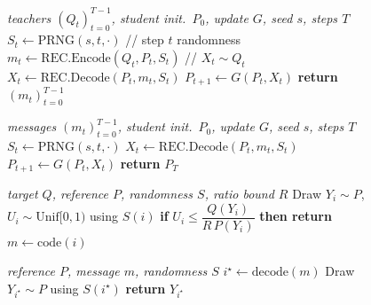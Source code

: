 \documentclass{article}
\newcommand{\cmt}[1]{\hfill{\color{cmt}// #1}}
\newcommand{\algstyle}{\renewcommand{\algorithmicrequire}{\textit{\textbf{Input:}}}}
\theoremstyle{plain}
\theoremstyle{definition}
\theoremstyle{remark}
\begin{document}
\begin{figure}[t]
%
\noindent
\begin{minipage}[t]{0.49\linewidth}
\begin{tcolorbox}[algbox={encInk}{encBody}{encBar}{Requential.Encode}, equal height group=algr1]
\begin{algorithmic}[1]
\algstyle
\REQUIRE \textit{teachers $(Q_t)_{t=0}^{T-1}$, student init.\ $P_0$, update $G$, seed $s$, steps $T$}
  \STATE $S_t \leftarrow \mathrm{PRNG}(s,t,\cdot)$ \cmt{step $t$ randomness}
  \STATE $m_t \leftarrow \mathrm{REC.Encode}(Q_t, P_t, S_t)$ \cmt{$X_t \sim Q_t$}
  \STATE $X_t \leftarrow \mathrm{REC.Decode}(P_t, m_t, S_t)$
  \STATE $P_{t+1} \leftarrow G(P_t, X_t)$
\ENDFOR
\STATE \textbf{return} $(m_t)_{t=0}^{T-1}$
\end{algorithmic}
\end{tcolorbox}
\end{minipage}\hfill
\begin{minipage}[t]{0.49\linewidth}
\begin{tcolorbox}[algbox={decInk}{decBody}{decBar}{Requential.Decode}, equal height group=algr1]
\begin{algorithmic}[1]
\algstyle
\REQUIRE \textit{messages $(m_t)_{t=0}^{T-1}$, student init.\ $P_0$, update $G$, seed $s$, steps $T$}
  \STATE $S_t \leftarrow \mathrm{PRNG}(s,t,\cdot)$
  \STATE $X_t \leftarrow \mathrm{REC.Decode}(P_t, m_t, S_t)$
  \STATE $P_{t+1} \leftarrow G(P_t, X_t)$
\ENDFOR
\STATE \textbf{return} $P_T$
\end{algorithmic}
\end{tcolorbox}
\end{minipage}

\vspace{2.5mm}
%
\noindent
\begin{minipage}[t]{0.49\linewidth}
\begin{tcolorbox}[algbox={encInk}{encBody}{encBar}{REC.Encode~\,\normalfont\itshape\scriptsize\color{cmt}(rejection sampling)}, equal height group=algr2]
\begin{algorithmic}[1]
\algstyle
\REQUIRE \textit{target $Q$, reference $P$, randomness $S$, ratio bound $R$}
  \STATE Draw $Y_i \sim P$, $U_i \sim \mathrm{Unif}[0,1)$ using $S(i)$
  \STATE \textbf{if} $U_i \leq \dfrac{Q(Y_i)}{R\,P(Y_i)}$ \textbf{then return} $m \leftarrow \mathrm{code}(i)$
\ENDFOR
\end{algorithmic}
\end{tcolorbox}
\end{minipage}\hfill
\begin{minipage}[t]{0.49\linewidth}
\begin{tcolorbox}[algbox={decInk}{decBody}{decBar}{REC.Decode}, equal height group=algr2]
\begin{algorithmic}[1]
\algstyle
\REQUIRE \textit{reference $P$, message $m$, randomness $S$}
\STATE $i^\star \leftarrow \mathrm{decode}(m)$
\STATE Draw $Y_{i^\star} \sim P$ using $S(i^\star)$
\STATE \textbf{return} $Y_{i^\star}$
\end{algorithmic}
\end{tcolorbox}
\end{minipage}


\end{figure}
\end{document}
